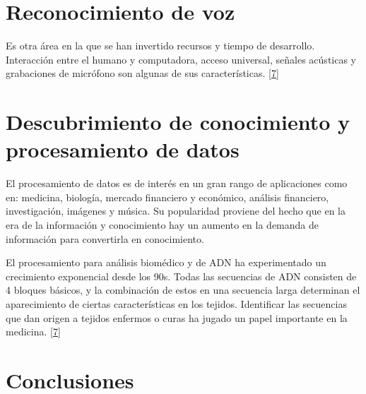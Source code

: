 \documentclass[12pt,spanish,Letterpaper,openany]{book}
\newcommand{\spacetwomilis}{\vspace{2mm}}
\begin{document}
\hypertarget{reconocimiento-de-voz}{%
\section{Reconocimiento de voz}\label{reconocimiento-de-voz}}

Es otra área en la que se han invertido recursos y tiempo de desarrollo. Interacción entre el humano y computadora, acceso universal, señales acústicas y grabaciones de micrófono son algunas de sus características. \protect\hyperlink{articulo12_ref07}{{[}7{]}}

\hypertarget{descubrimiento-de-conocimiento-y-procesamiento-de-datos}{%
\section{Descubrimiento de conocimiento y procesamiento de datos}\label{descubrimiento-de-conocimiento-y-procesamiento-de-datos}}

\spacetwomilis

El procesamiento de datos es de interés en un gran rango de aplicaciones como en: medicina, biología, mercado financiero y económico, análisis financiero, investigación, imágenes y música. Su popularidad proviene del hecho que en la era de la información y conocimiento hay un aumento en la demanda de información para convertirla en conocimiento.

El procesamiento para análisis biomédico y de ADN ha experimentado un crecimiento exponencial desde los 90s. Todas las secuencias de ADN consisten de 4 bloques básicos, y la combinación de estos en una secuencia larga determinan el aparecimiento de ciertas características en los tejidos. Identificar las secuencias que dan origen a tejidos enfermos o curas ha jugado un papel importante en la medicina. \protect\hyperlink{articulo12_ref07}{{[}7{]}}

\hypertarget{conclusiones-11}{%
\section*{Conclusiones}\label{conclusiones-11}}
\end{document}

